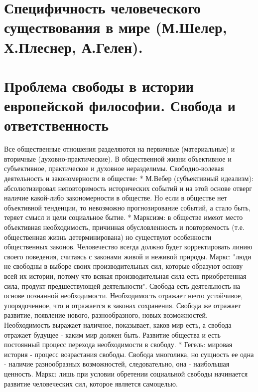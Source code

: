 \documentclass[12pt]{article}
\begin{document}
\newpage
\section{Специфичность человеческого существования в мире (М.Шелер, Х.Плеснер, А.Гелен). }


\newpage
\section{Проблема свободы в истории европейской философии. Свобода и ответственность}
Все общественные отношения разделяются на первичные (материальные) и вторичные (духовно-практические).
В общественной жизни объективное и субъективное, практическое и духовное неразделимы.
Свободно-волевая деятельность и закономерности в обществе:
 * М.Вебер (субъективный идеализм): абсолютизировал неповторимость исторических событий и на этой
основе отверг наличие какой-либо закономерности в обществе. Но если в обществе нет объективной тенденции,
то невозможно прогнозирование событий, а стало быть, теряет смысл и цели социальное бытие.
 * Марксизм: в обществе имеют место объективная необходимость, причинная обусловленность и
повторяемость (т.е. общественная жизнь детерминирована) но существуют особенности общественных законов.
Человечество всегда должно будет корректировать линию своего поведения, считаясь с законами живой и
неживой природы. Маркс: "люди не свободны в выборе своих производительных сил, которые образуют основу
всей их истории, потому что всякая производительная сила есть приобретенная сила, продукт предшествующей
деятельности". Свобода есть деятельность на основе познанной необходимости. Необходимость отражает нечто
устойчивое, упорядоченное, что и отражается в законах сохранения. Свобода же отражает развитие, появление
нового, разнообразного, новых возможностей. Необходимость выражает наличное, показывает, каков мир есть,
а свобода отражает будущее - каким мир должен быть. Развитие общества и есть постоянный процесс перехода
необходимости в свободу.
* Гегель: мировая история - процесс возрастания свободы. Свобода многолика, но сущность ее одна - наличие
разнообразных возможностей, следовательно, она - наибольшая ценность. Маркс: лишь при условии обретении
социальной свободы начинается развитие человеческих сил, которое является самоцелью.


\newpage
\end{document}
